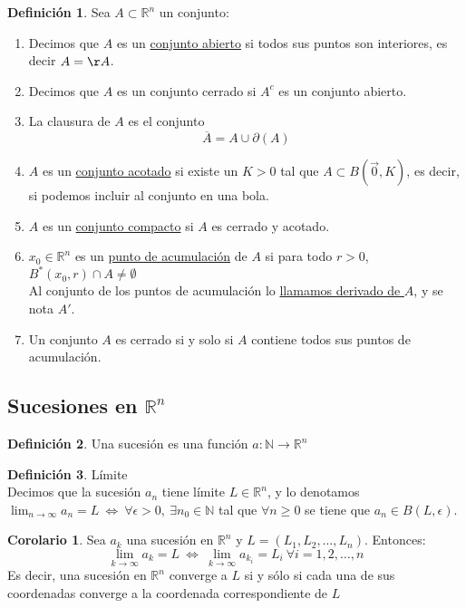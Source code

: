 \documentclass[10pt]{article}
\theoremstyle{definition}
\newtheorem{definition}{Definición}[section]
\newtheorem{corollary}{Corolario}[theorem]
\begin{document}
\begin{definition}
    Sea $A\subset\mathbb{R}^n$ un conjunto:
    \begin{enumerate}
        \item Decimos que $A$ es un \underline{conjunto abierto} si todos sus puntos son interiores, es decir $A={\r A}$.
        \item Decimos que $A$ es un conjunto cerrado si $A^c$ es un conjunto abierto.
        \item La clausura de $A$ es el conjunto $$\overline{A}=A\cup\partial(A)$$
        \item $A$ es un \underline{conjunto acotado} si existe un $K>0$ tal que $A\subset B(\vec{0},K)$, es decir, si podemos incluir al conjunto en una bola.
        \item $A$ es un \underline{conjunto compacto} si $A$ es cerrado y acotado.
        \item $x_0\in\mathbb{R}^n$ es un \underline{punto de acumulación} de $A$ si para todo $r>0$, $B^*(x_0,r)\cap A\ne\emptyset$
            \\Al conjunto de los puntos de acumulación lo \underline{llamamos derivado de $A$}, y se nota $A'$.
        \item Un conjunto $A$ es cerrado si y solo si $A$ contiene todos sus puntos de acumulación.
    \end{enumerate}
\end{definition}
\newpage\subsection{Sucesiones en $\mathbb{R}^n$}
\begin{definition}
    Una sucesión es una función $a:\mathbb{N}\to\mathbb{R}^n$
\end{definition}
\begin{definition}{Límite}
    \\Decimos que la sucesión $a_n$ tiene límite $L\in\mathbb{R}^n$, y lo denotamos $\lim_{n \to \infty}a_n=L\ \Leftrightarrow\ \forall\epsilon>0,\ \exists n_0\in\mathbb{N}$ tal que $\forall n\ge 0$ se tiene que $a_n\in B(L,\epsilon)$.
\end{definition}
\begin{corollary}
    Sea $a_k$ una sucesión en $\mathbb{R}^n$ y $L=(L_1,L_2,\dots,L_n)$. Entonces: $$\lim_{k \to \infty}a_k=L\ \Leftrightarrow\ \lim_{k \to \infty}a_{k_i}=L_i\ \forall i=1,2,\dots,n$$
    Es decir, una sucesión en $\mathbb{R}^n$ converge a $L$ si y sólo si cada una de sus coordenadas converge a la coordenada correspondiente de $L$
\end{corollary}
\end{document}
